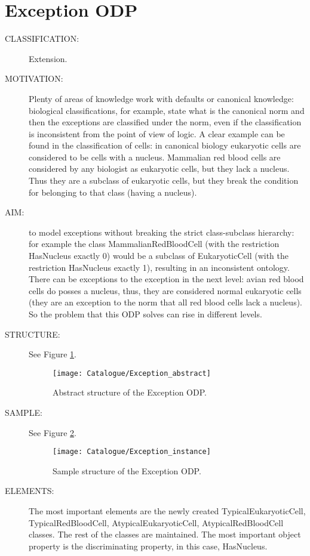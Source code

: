  \section{Exception ODP}\begin{description}
\item [CLASSIFICATION:] Extension.

\item [MOTIVATION:] Plenty of areas of knowledge work with defaults or canonical knowledge: biological classifications, for example, state what is the canonical norm and then the exceptions are classified under the norm, even if the classification is inconsistent from the point of view of logic. A clear example can be found in the classification of cells: in canonical biology eukaryotic cells are considered to be cells with a nucleus. Mammalian red blood cells are considered by any biologist as eukaryotic cells, but they lack a nucleus. Thus they are a subclass of eukaryotic cells, but they break the condition for belonging to that class (having a nucleus).

\item [AIM:] to model exceptions without breaking the strict class-subclass hierarchy: for example the class MammalianRedBloodCell (with the restriction HasNucleus exactly 0) would be a subclass of EukaryoticCell (with the restriction HasNucleus exactly 1), resulting in an inconsistent ontology. There can be exceptions to the exception in the next level: avian red blood cells do posses a nucleus, thus, they are considered normal eukaryotic cells (they are an exception to the norm that all red blood cells lack a nucleus). So the problem that this ODP solves can rise in different levels.

\item [STRUCTURE:] See Figure \ref{odp:Exception_abstract}.
\begin{figure}[]\centering\texttt{[image: Catalogue/Exception\_abstract]}\caption{\label{odp:Exception_abstract} Abstract structure of the Exception ODP.}\end{figure}

\item [SAMPLE:] See Figure \ref{odp:Exception_instance}.
\begin{figure}[]\centering\texttt{[image: Catalogue/Exception\_instance]}\caption{\label{odp:Exception_instance} Sample structure of the Exception ODP.}\end{figure}

\item [ELEMENTS:] The most important elements are the newly created TypicalEukaryoticCell, TypicalRedBloodCell, AtypicalEukaryoticCell, AtypicalRedBloodCell classes. The rest of the classes are maintained. The most important object property is the discriminating property, in this case, HasNucleus.


\end{description}
